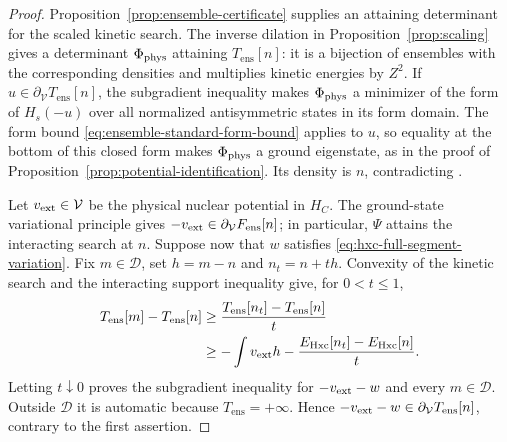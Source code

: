 \begin{proof}
Proposition~\ref{prop:ensemble-certificate} supplies an attaining determinant for
the scaled kinetic search.  The inverse dilation in
Proposition~\ref{prop:scaling} gives a determinant $\Phi_{\rm phys}$ attaining
$T_{\mathrm{ens}}[n]$: it is a bijection of ensembles with the
corresponding densities and multiplies kinetic energies by $Z^2$.
If $u\in\partial_{\mathcal V}T_{\mathrm{ens}}[n]$, the subgradient
inequality makes $\Phi_{\rm phys}$ a minimizer of the form of $H_s(-u)$
over all normalized antisymmetric states in its form domain.
The form bound \eqref{eq:ensemble-standard-form-bound} applies to $u$,
so equality at the bottom of this closed form makes $\Phi_{\rm phys}$
a ground eigenstate, as in the proof of
Proposition~\ref{prop:potential-identification}.  Its density is $n$, contradicting
.

Let $v_{\rm ext}\in\mathcal V$ be the physical nuclear potential in
$H_C$.  The ground-state variational principle gives
$-v_{\rm ext}\in\partial_{\mathcal V}F_{\mathrm{ens}}[n]$;
in particular, $\Psi$ attains the interacting search at $n$.
Suppose now that $w$ satisfies \eqref{eq:hxc-full-segment-variation}.
Fix $m\in\mathcal D$, set $h=m-n$ and $n_t=n+th$.  Convexity of the
kinetic search and the interacting support inequality give, for
$0<t\le1$,
\begin{align*}
 T_{\mathrm{ens}}[m]-T_{\mathrm{ens}}[n]
 &\ge\frac{T_{\mathrm{ens}}[n_t]-T_{\mathrm{ens}}[n]}{t}\\
 &\ge-\int v_{\rm ext}h
       -\frac{E_{\mathrm{Hxc}}[n_t]-E_{\mathrm{Hxc}}[n]}{t}.
\end{align*}
Letting $t\downarrow0$ proves the subgradient inequality for
$-v_{\rm ext}-w$ and every $m\in\mathcal D$.  Outside $\mathcal D$ it
is automatic because $T_{\mathrm{ens}}=+\infty$.  Hence
$-v_{\rm ext}-w\in\partial_{\mathcal V}T_{\mathrm{ens}}[n]$, contrary
to the first assertion.
\end{proof}
